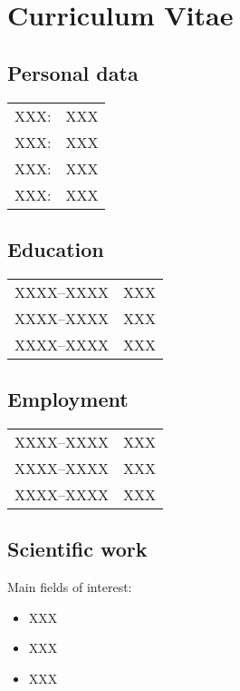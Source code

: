 \chapter{Curriculum Vitae}

\section*{Personal data}

\begin{tabular}{@{}l@{\hskip7mm}l}
XXX:       &XXX\\
XXX:       &XXX\\
XXX:       &XXX\\
XXX:       &XXX
\end{tabular}

\section*{Education}

\begin{tabular}{@{}l@{\hskip7mm}p{90mm}}
XXXX--XXXX         & XXX\\
XXXX--XXXX         & XXX\\
XXXX--XXXX         & XXX
\end{tabular}

\section*{Employment}

\begin{tabular}{@{}l@{\hskip7mm}p{90mm}}
XXXX--XXXX         & XXX\\
XXXX--XXXX         & XXX\\
XXXX--XXXX         & XXX
\end{tabular}

\section*{Scientific work}

Main fields of interest:
\begin{itemize}
  \item XXX
  \item XXX
  \item XXX
\end{itemize}